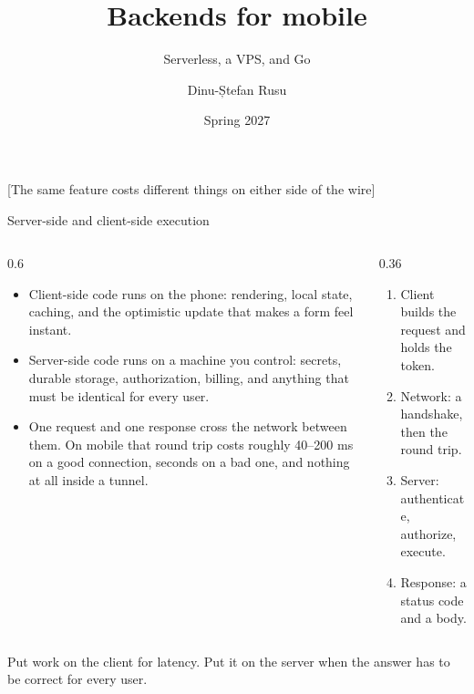 \documentclass[10pt,aspectratio=169,t]{beamer}
\title{Backends for mobile}
\subtitle{Serverless, a VPS, and Go}
\author{Dinu-Ștefan Rusu}
\institute{FILS, Universitatea Politehnica București}
\date{Spring 2027}
\begin{document}
\titleframe


[The same feature costs different things on either side of the wire]

\begin{frame}[eyebrow=Server and client]{Server-side and client-side execution}
  \begin{columns}[T]
    \begin{column}{0.6\textwidth}
      \begin{itemize}
        \item Client-side code runs on the phone: rendering, local state, caching, and the optimistic update that makes a form feel instant.
        \item Server-side code runs on a machine you control: secrets, durable storage, authorization, billing, and anything that must be identical for every user.
        \item One request and one response cross the network between them. On mobile that round trip costs roughly 40–200 ms on a good connection, seconds on a bad one, and nothing at all inside a tunnel.
      \end{itemize}
    \end{column}
    \begin{column}{0.36\textwidth}
      \begin{enumerate}
        \item Client builds the request and holds the token.
        \item Network: a handshake, then the round trip.
        \item Server: authenticate, authorize, execute.
        \item Response: a status code and a body.
      \end{enumerate}
    \end{column}
  \end{columns}
  \begin{takeaway}{Put work on the client for latency.}
    Put it on the server when the answer has to be correct for every user.
  \end{takeaway}
\end{frame}
\end{document}
